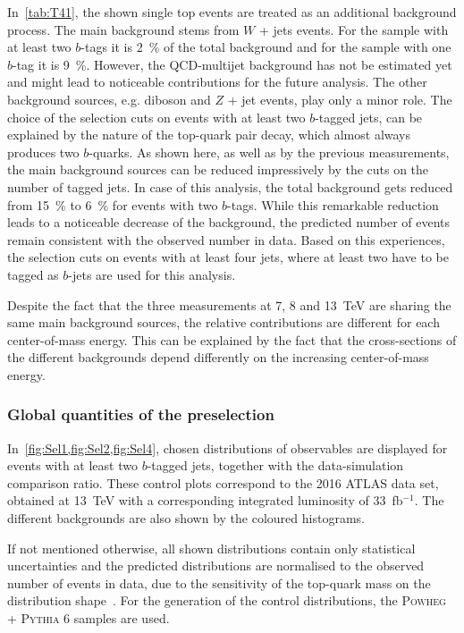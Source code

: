 In~\cref{tab:T41}, the shown single top events are treated as an additional background process.
The main background stems from $W$ + jets events. For the sample with at least two $b$-tags it is  2~\% of the total background and for the sample with one $b$-tag it is 9~\%. However, the QCD-multijet background has not be estimated yet and might lead to noticeable contributions for the future analysis. The other background sources, e.g.  diboson  and $Z$ + jet events, play only a minor role. 
The choice of the selection cuts on events with at least two $b$-tagged jets, can be explained by the nature of the top-quark pair decay, which almost always produces two $b$-quarks.  As shown here, as well as by the previous measurements, the main background sources can be reduced impressively by the cuts on the number of tagged jets. In case of this analysis, the total background gets reduced from  15~\% to 6~\% for events with two  $b$-tags. While this remarkable reduction leads to a noticeable decrease of the background, the predicted number of events remain consistent with the observed number in data. Based on this experiences, the selection cuts on events with at least four jets, where at least two have to be tagged as $b$-jets are used for this analysis.

Despite the fact that the three measurements at 7, 8 and 13~TeV are sharing the same main background sources, the relative contributions are different for each center-of-mass energy. This can be explained by the fact that the cross-sections of the different backgrounds depend differently on the increasing center-of-mass energy.


\subsubsection{Global quantities of the preselection}

In~\cref{fig:Sel1,fig:Sel2,fig:Sel4}, chosen distributions of observables are displayed for events with at least two $b$-tagged jets, together with the data-simulation comparison ratio. These control plots correspond to the  2016 ATLAS data set, obtained at 13~TeV with a corresponding integrated luminosity of 33~fb$^{-1}$. The different backgrounds are also shown by the coloured histograms. 

If not mentioned otherwise, all shown distributions contain only statistical uncertainties and the  predicted distributions are normalised to the observed number of events in data, due to the sensitivity of the top-quark mass on the distribution shape~\cite{ATLAS-CONF-2017-071}. For the generation of  the control distributions, the \textsc{Powheg} + \textsc{Pythia 6} samples are used.

